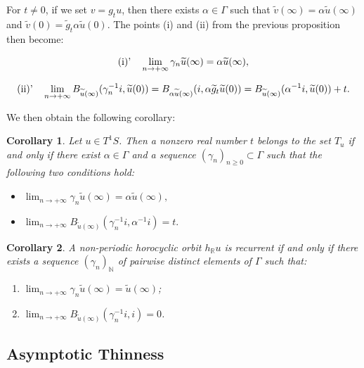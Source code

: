 \documentclass[11pt]{amsart}
\newtheorem{cor}{Corollary}[section]
\begin{document}
For \( t \neq 0 \), if we set \( v = g_t u \), then there exists \( \alpha \in \Gamma \) such that \( \widetilde{v}(\infty) = \alpha \widetilde{u}(\infty) \) and \( \widetilde{v}(0) = \widetilde{g}_t \alpha \widetilde{u}(0) \).  
The points (i) and (ii) from the previous proposition then become:

\[
\textnormal{(i)'} \quad \lim_{n \to +\infty} \gamma_n \widetilde{u}(\infty) = \alpha \widetilde{u}(\infty),
\]

\[
\textnormal{(ii)'} \quad \lim_{n \to +\infty} B_{\widetilde{u}(\infty)}(\gamma_n^{-1}i, \widetilde{u}(0)) = B_{\alpha \widetilde{u}(\infty)}(i, \alpha \widetilde{g}_t \widetilde{u}(0)) = B_{\widetilde{u}(\infty)}(\alpha^{-1} i, \widetilde{u}(0)) + t.
\]

We then obtain the following corollary:

\begin{cor}\label{tunv}
Let \( u \in T^1S \). Then a nonzero real number \( t \) belongs to the set \( T_u \) if and only if there exist \( \alpha \in \Gamma \) and a sequence \( (\gamma_n)_{n \geq 0} \subset \Gamma \) such that the following two conditions hold:
\begin{itemize}
    \item[\textnormal{(i)}] \( \displaystyle\lim_{n \to +\infty} \gamma_n \widetilde{u}(\infty) = \alpha \widetilde{u}(\infty), \)
    \item[\textnormal{(ii)}] \( \displaystyle\lim_{n \to +\infty} B_{\widetilde{u}(\infty)}(\gamma_n^{-1} i, \alpha^{-1} i) = t. \)
\end{itemize}
\end{cor}

\begin{cor}\label{MM}
A non-periodic horocyclic orbit \( h_{\mathbb{R}} u \) is recurrent if and only if there exists a sequence \( (\gamma_n)_{\mathbb{N}} \) of pairwise distinct elements of \( \Gamma \) such that:
\begin{enumerate}
    \item \( \displaystyle\lim_{n \to +\infty} \gamma_n \widetilde{u}(\infty) = \widetilde{u}(\infty) \);
    \item \( \displaystyle\lim_{n \to +\infty} B_{\widetilde{u}(\infty)}(\gamma_n^{-1} i, i) = 0 \).
\end{enumerate}
\end{cor}
\subsection{Asymptotic Thinness}
\end{document}
